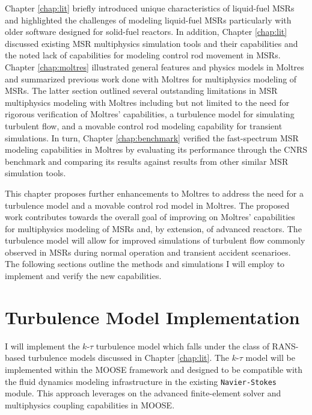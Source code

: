 Chapter \ref{chap:lit} briefly introduced unique characteristics of liquid-fuel
\glspl{MSR}
and highlighted the challenges of modeling liquid-fuel \glspl{MSR} particularly
with older software designed for solid-fuel reactors. In addition, Chapter
\ref{chap:lit} discussed existing \gls{MSR} multiphysics simulation tools and
their capabilities and the noted lack of capabilities for modeling control rod
movement in \glspl{MSR}. Chapter \ref{chap:moltres} illustrated general
features and physics models in Moltres and summarized previous work done with
Moltres for multiphysics modeling of \glspl{MSR}. The latter section outlined
several outstanding limitations in \gls{MSR} multiphysics modeling with
Moltres including but not limited to the need for rigorous verification of
Moltres' capabilities, a turbulence model for simulating turbulent flow, and a
movable control rod modeling capability for transient simulations. In turn,
Chapter \ref{chap:benchmark} verified the fast-spectrum
\gls{MSR} modeling capabilities in Moltres by evaluating its performance
through the CNRS benchmark and comparing its results against results from other
similar \gls{MSR} simulation tools.

This chapter proposes further enhancements to Moltres to address the
need for a turbulence model and a movable control rod model in Moltres. The
proposed work
contributes towards the overall goal of improving on Moltres' capabilities for
multiphysics modeling of \glspl{MSR} and, by extension, of advanced reactors.
The turbulence model will allow for improved simulations of turbulent flow
commonly observed in \glspl{MSR} during normal operation and transient accident
scenarioes. The following sections outline the methods and simulations I will
employ to implement and verify the new capabilities.

\section{Turbulence Model Implementation}

I will implement the $k$-$\tau$ turbulence model which falls under the class of
\gls{RANS}-based turbulence models discussed in Chapter \ref{chap:lit}. The
$k$-$\tau$ model will be implemented within the \gls{MOOSE} framework and
designed to be compatible with the fluid dynamics modeling infrastructure in
the existing \texttt{Navier-Stokes} module. This approach leverages on the
advanced finite-element solver and multiphysics coupling capabilities in
\gls{MOOSE}.


